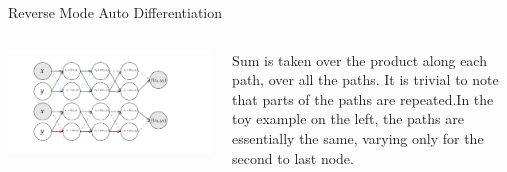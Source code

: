 \begin{frame}{Reverse Mode Auto Differentiation}
\begin{columns}[T]
\begin{column}{0.7\textwidth}
\begin{center}
	\includegraphics[width=\textwidth]{images/path comp.png}
\end{center}
\end{column}
\begin{column}{0.3\textwidth}
Sum is taken over the product along each path, over all the paths. It is trivial to note that parts of the paths are repeated.\pause In the toy example on the left, the paths are essentially the same, varying only for the second to last node.	
\end{column}
\end{columns}
\end{frame}

